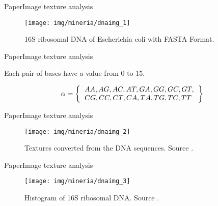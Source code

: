 \documentclass[10pt]{beamer}
\newcommand{\1}{
	\setbeamertemplate{background}{
		\texttt{[image: img/1\_dna]}
		\tikz[overlay] \fill[fill opacity=0.75,fill=white] (0,0) rectangle (-\paperwidth,\paperheight);
	}
}
\begin{document}
\begin{frame}{Paper}{Image texture analysis}
	\begin{figure}[]
		\centering
		\texttt{[image: img/mineria/dnaimg\_1]}
		\label{img:mot2}
		\caption{16S ribosomal DNA of Escherichia coli with FASTA Format.}
	\end{figure}
\end{frame}

\begin{frame}{Paper}{Image texture analysis}
	\begin{block}{}
		Each pair of bases have a value from $0$ to $15$.
		
		\begin{equation}
			\alpha = \left\lbrace \begin{tabular}{l}
			$AA, AG, AC, AT, GA, GG, GC, GT,$\\
			$CG, CC, CT, CA, TA, TG, TC, TT$
			\end{tabular}      
			  \right\rbrace
		\end{equation}
		
	\end{block}
\end{frame}


\begin{frame}{Paper}{Image texture analysis}
	\begin{figure}[]
		\centering
		\texttt{[image: img/mineria/dnaimg\_2]}
		\label{img:mot2}
		\caption{Textures converted from the DNA sequences. Source \cite{delibacs2020dna}.}
	\end{figure}
\end{frame}

\begin{frame}{Paper}{Image texture analysis}
	\begin{figure}[]
		\centering
		\texttt{[image: img/mineria/dnaimg\_3]}
		\label{img:mot2}
		\caption{Histogram of 16S ribosomal DNA. Source \cite{delibacs2020dna}.}
	\end{figure}
\end{frame}
\end{document}
